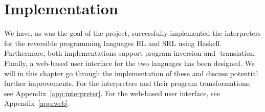 \chapter{Implementation}

We have, as was the goal of the project, successfully implemented the interpreters for the reversible programming languages RL and SRL using Haskell. Furthermore, both implementations support program inversion and -translation. Finally, a web-based user interface for the two languages has been designed. We will in this chapter go through the implementation of these and discuss potential further improvements. For the interpreters and their program transformations, see Appendix~\ref{app:interpreter}. For the web-based user interface, see Appendix~\ref{app:web}.







